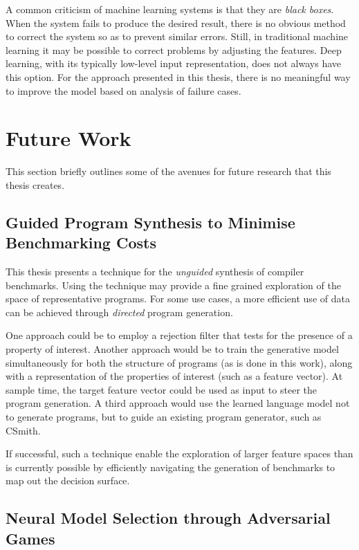 A common criticism of machine learning systems is that they are \emph{black boxes}. When the system fails to produce the desired result, there is no obvious method to correct the system so as to prevent similar errors. Still, in traditional machine learning it may be possible to correct problems by adjusting the features. Deep learning, with its typically low-level input representation, does not always have this option. For the approach presented in this thesis, there is no meaningful way to improve the model based on analysis of failure cases.


\section{Future Work}
\label{sec:future-work}

This section briefly outlines some of the avenues for future research that this thesis creates.

\subsection{Guided Program Synthesis to Minimise Benchmarking Costs}

This thesis presents a technique for the \emph{unguided} synthesis of compiler benchmarks. Using the technique may provide a fine grained exploration of the space of representative programs. For some use cases, a more efficient use of data can be achieved through \emph{directed} program generation.

One approach could be to employ a rejection filter that tests for the presence of a property of interest. Another approach would be to train the generative model simultaneously for both the structure of programs (as is done in this work), along with a representation of the properties of interest (such as a feature vector). At sample time, the target feature vector could be used as input to steer the program generation. A third approach would use the learned language model not to generate programs, but to guide an existing program generator, such as CSmith.

If successful, such a technique enable the exploration of larger feature spaces than is currently possible by efficiently navigating the generation of benchmarks to map out the decision surface.


\subsection{Neural Model Selection through Adversarial Games}

